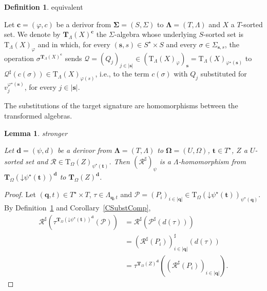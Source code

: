 \documentclass[a4paper, reqno]{amsbook}
\makeatletter
\newcommand{\bb}[1]{\ensuremath{\lvert #1 \rvert}}
\newcommand{\vs}[1]{\mathbin{\downarrow}#1}
\newcommand{\sig}[1]{\mathbf{#1}}             %
\theoremstyle{plain}
\newtheorem{lemma}[theorem]{Lemma}
\theoremstyle{definition}
\newtheorem{definition}[theorem]{Definition}
\newcommand*{\CA@leanpending}{}
\newcommand*{\CA@leanrelation}{}
\newcommand*{\lean}[2]{%
  \ifcsname\string\color@lean@#1\endcsname\else
    \PackageError{main}{Unknown relation `#1' in \string\lean}{Use equivalent, weaker or stronger.}%
  \fi
  \gdef\CA@leanrelation{#1}%
  \gdef\CA@leanpending{#2}}
\makeatother
\begin{document}
\begin{definition}\label{DTermAlgTransformed}\lean{equivalent}{Derivor.transformed}
Let $\mathbf{c}=(\varphi,c)$ be a derivor from $\sig{\Sigma}=(S,\Sigma)$ to $\sig{\Lambda}=(T,\Lambda)$ and $X$ a $T$-sorted set.
We denote by $\mathbf{T}_{\Lambda}(X)^{\mathbf{c}}$ the $\Sigma$-algebra whose underlying $S$-sorted set is $\mathrm{T}_{\Lambda}(X)_{\varphi}$ and in which, for every $(\mathbf{s},s)\in S^{\star}\times S$ and every $\sigma\in\Sigma_{\mathbf{s},s}$, the operation $\sigma^{\mathbf{T}_{\Lambda}(X)^{\mathbf{c}}}$ sends $\mathcal{Q}=(Q_{j})_{j\in\bb{\mathbf{s}}}\in(\mathrm{T}_{\Lambda}(X)_{\varphi})_{\mathbf{s}}=\mathrm{T}_{\Lambda}(X)_{\varphi^{\star}(\mathbf{s})}$ to $\mathcal{Q}^{\sharp}(c(\sigma))\in\mathrm{T}_{\Lambda}(X)_{\varphi(s)}$, i.e., to the term $c(\sigma)$ with $Q_{j}$ substituted for $v^{\varphi^{\star}(\mathbf{s})}_{j}$, for every $j\in\bb{\mathbf{s}}$.
\end{definition}

The substitutions of the target signature are homomorphisms between the transformed algebras.

\begin{lemma}\label{LSubstTransformedHom}\lean{stronger}{Derivor.substHom}
Let $\mathbf{d}=(\psi,d)$ be a derivor from $\sig{\Lambda}=(T,\Lambda)$ to $\sig{\Omega}=(U,\Omega)$, $\mathbf{t}\in T^{\star}$, $Z$ a $U$-sorted set and $\mathcal{R}\in\mathrm{T}_{\Omega}(Z)_{\psi^{\star}(\mathbf{t})}$.
Then $(\mathcal{R}^{\sharp})_{\psi}$ is a $\Lambda$-homomorphism from $\mathbf{T}_{\Omega}(\vs{\psi^{\star}(\mathbf{t})})^{\mathbf{d}}$ to $\mathbf{T}_{\Omega}(Z)^{\mathbf{d}}$.
\end{lemma}
\begin{proof}
Let $(\mathbf{q},t)\in T^{\star}\times T$, $\tau\in\Lambda_{\mathbf{q},t}$ and $\mathcal{P}=(P_{i})_{i\in\bb{\mathbf{q}}}\in\mathrm{T}_{\Omega}(\vs{\psi^{\star}(\mathbf{t})})_{\psi^{\star}(\mathbf{q})}$.
By Definition~\ref{DTermAlgTransformed} and Corollary~\ref{CSubstComp},
\begin{align*}
\mathcal{R}^{\sharp}\left(\tau^{\mathbf{T}_{\Omega}(\vs{\psi^{\star}(\mathbf{t})})^{\mathbf{d}}}(\mathcal{P})\right)
&=\mathcal{R}^{\sharp}\left(\mathcal{P}^{\sharp}(d(\tau))\right)
\\&=\left(\mathcal{R}^{\sharp}(P_{i})\right)^{\sharp}_{i\in\bb{\mathbf{q}}}(d(\tau))
\\&=\tau^{\mathbf{T}_{\Omega}(Z)^{\mathbf{d}}}\left(\left(\mathcal{R}^{\sharp}(P_{i})\right)_{i\in\bb{\mathbf{q}}}\right).
\end{align*}
\end{proof}
\end{document}
